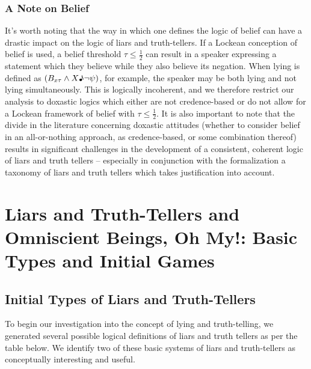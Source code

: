 \documentclass[12pt, titlepage, twoside, a4paper]{report}
\begin{document}
\subsection{A Note on Belief}
It’s worth noting that the way in which one defines the logic of belief can have a drastic impact on the logic of liars and truth-tellers. If a Lockean conception of belief is used, a belief threshold $\tau \leq \frac{1}{2}$ can result in a speaker expressing a statement which they believe while they also believe its negation. When lying is defined as $(B_{x\tau} \wedge X\text{\textmusicalnote} \neg \psi)$, for example, the speaker may be both lying and not lying simultaneously. This is logically incoherent, and we therefore restrict our analysis to doxastic logics which either are not credence-based or do not allow for a Lockean framework of belief with $\tau \leq \frac{1}{2}$. 
It is also important to note that the divide in the literature concerning doxastic attitudes (whether to consider belief in an all-or-nothing approach, as credence-based, or some combination thereof) results in significant challenges in the development of a consistent, coherent logic of liars and truth tellers – especially in conjunction with the formalization a taxonomy of liars and truth tellers which takes justification into account.\autocite{Buchak2014,Jackson2018,AdamCarter2016,Jackson2018}

\chapter{Liars and Truth-Tellers and Omniscient Beings, Oh My!: Basic Types and Initial Games}
\section{Initial Types of Liars and Truth-Tellers}
To begin our investigation into the concept of lying and truth-telling, we generated several possible logical definitions of liars and truth tellers as per the table below. We identify two of these basic systems of liars and truth-tellers as conceptually interesting and useful.
\end{document}

